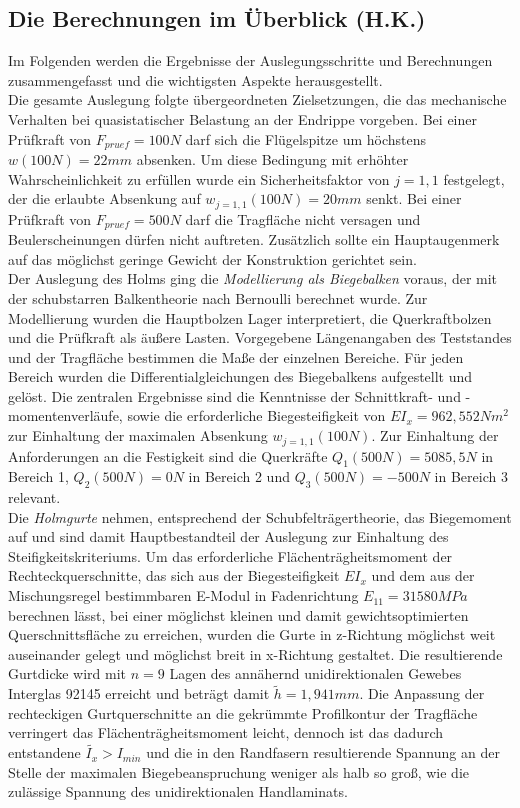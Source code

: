 \subsection{Die Berechnungen im Überblick (H.K.)}
Im Folgenden werden die Ergebnisse der Auslegungsschritte und Berechnungen zusammengefasst und die wichtigsten Aspekte herausgestellt.\\

\noindent Die gesamte Auslegung folgte übergeordneten Zielsetzungen, die das mechanische Verhalten bei quasistatischer Belastung an der Endrippe vorgeben. Bei einer Prüfkraft von $ F_{pruef}=100N $ darf sich die Flügelspitze um höchstens $ w(100N)=22mm $ absenken. Um diese Bedingung mit erhöhter Wahrscheinlichkeit zu erfüllen wurde ein Sicherheitsfaktor von $ j=1,1 $ festgelegt, der die erlaubte Absenkung auf $ w_{j=1,1}(100N)=20mm $ senkt. Bei einer Prüfkraft von $ F_{pruef}=500N $ darf die Tragfläche nicht versagen und Beulerscheinungen dürfen nicht auftreten. Zusätzlich sollte ein Hauptaugenmerk auf das möglichst geringe Gewicht der Konstruktion gerichtet sein.\\

\noindent Der Auslegung des Holms ging die \textit{Modellierung als Biegebalken} voraus, der mit der schubstarren Balkentheorie nach Bernoulli berechnet wurde. Zur Modellierung wurden die Hauptbolzen Lager interpretiert, die Querkraftbolzen und die Prüfkraft als äußere Lasten. Vorgegebene Längenangaben des Teststandes und der Tragfläche bestimmen die Maße der einzelnen Bereiche. Für jeden Bereich wurden die Differentialgleichungen des Biegebalkens aufgestellt und gelöst. Die zentralen Ergebnisse sind die Kenntnisse der Schnittkraft- und -momentenverläufe, sowie die erforderliche Biegesteifigkeit von $ EI_{x}=962,552Nm^{2} $ zur Einhaltung der maximalen Absenkung $ w_{j=1,1}(100N) $. Zur Einhaltung der Anforderungen an die Festigkeit sind die Querkräfte $ Q_{1}(500N)=5085,5N $ in Bereich 1, $ Q_{2}(500N)=0N $ in Bereich 2 und $ Q_{3}(500N)=-500N $ in Bereich 3 relevant.\\

\noindent Die \textit{Holmgurte} nehmen, entsprechend der Schubfelträgertheorie, das Biegemoment auf und sind damit Hauptbestandteil der Auslegung zur Einhaltung des Steifigkeitskriteriums. Um das erforderliche Flächenträgheitsmoment der Rechteckquerschnitte, das sich aus der Biegesteifigkeit $ EI_{x} $ und dem aus der Mischungsregel bestimmbaren E-Modul in Fadenrichtung $ E_{11}=31580MPa $ berechnen lässt, bei einer möglichst kleinen und damit gewichtsoptimierten Querschnittsfläche zu erreichen, wurden die Gurte in z-Richtung möglichst weit auseinander gelegt und möglichst breit in x-Richtung gestaltet. Die resultierende Gurtdicke wird mit $ n=9 $ Lagen des annähernd unidirektionalen Gewebes Interglas 92145 erreicht und beträgt damit $ \tilde{h}=1,941mm $. Die Anpassung der rechteckigen Gurtquerschnitte an die gekrümmte Profilkontur der Tragfläche verringert das Flächenträgheitsmoment leicht, dennoch ist das dadurch entstandene $ \tilde{I_{x}}>I_{min} $ und die in den Randfasern resultierende Spannung an der Stelle der maximalen Biegebeanspruchung weniger als halb so groß, wie die zulässige Spannung des unidirektionalen Handlaminats.\\

